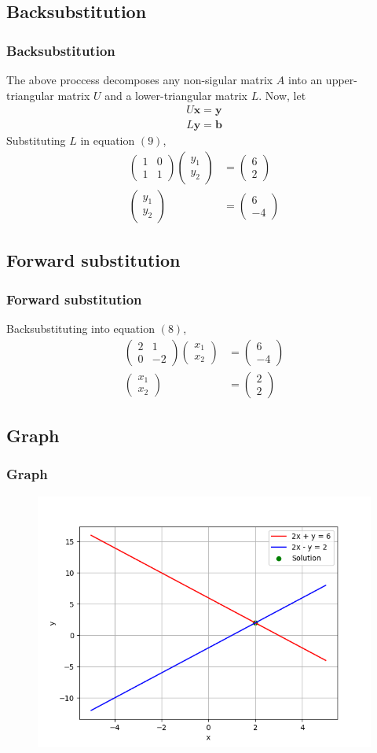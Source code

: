\documentclass{beamer}
\providecommand{\brak}[1]{\ensuremath{\left(#1\right)}}
\theoremstyle{remark}
\newcommand{\myvec}[1]{\ensuremath{\begin{pmatrix}#1\end{pmatrix}}}
\let\vec\mathbf
\numberwithin{equation}{section}
\begin{document}
    \subsection{Backsubstitution}
    \begin{frame}[fragile]
      \frametitle{Backsubstitution}
The above proccess decomposes any non-sigular matrix $A$ into an upper-triangular matrix $U$ and a lower-triangular matrix $L$.
Now, let
\begin{align}
  U\vec{x} = \vec{y}\\
  L\vec{y} = \vec{b}
\end{align}
Substituting $L$ in equation $\brak{9}$,
\begin{align}
  \myvec{1 & 0 \\ 1 & 1}\myvec{y_1 \\ y_2} &= \myvec{6 \\ 2}\\
  \myvec{y_1 \\ y_2} &= \myvec{6 \\ -4}
\end{align}
         \end{frame}
    \subsection{Forward substitution}
    \begin{frame}[fragile]
      \frametitle{Forward substitution}
Backsubstituting into equation $\brak{8}$,
\begin{align}
  \myvec{2 & 1 \\ 0 & -2}\myvec{x_1 \\ x_2} &= \myvec{6 \\ -4}\\
  \myvec{x_1 \\ x_2} &= \myvec{ 2 \\ 2}
\end{align}
         \end{frame}
         \subsection{Graph}
    \begin{frame}[fragile]
      \frametitle{Graph}
      \begin{figure}[h!]
        \centering
        \includegraphics[width=1\columnwidth]{figs/fig.png}
        \label{stemplot}
      \end{figure}
    \end{frame}
  
\end{document}
